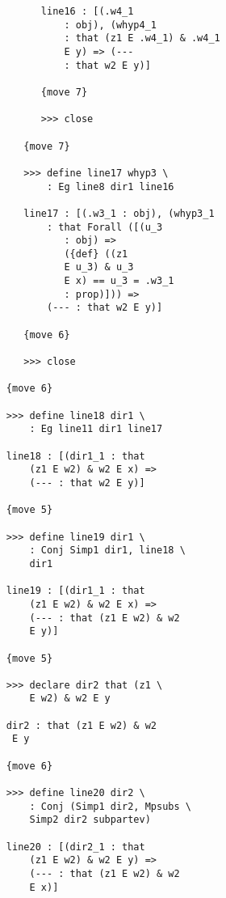 \documentclass[12pt]{article}
\begin{document}
\begin{verbatim}
                        line16 : [(.w4_1 
                            : obj), (whyp4_1 
                            : that (z1 E .w4_1) & .w4_1 
                            E y) => (--- 
                            : that w2 E y)]

                        {move 7}

                        >>> close

                     {move 7}

                     >>> define line17 whyp3 \
                         : Eg line8 dir1 line16

                     line17 : [(.w3_1 : obj), (whyp3_1 
                         : that Forall ([(u_3 
                            : obj) => 
                            ({def} ((z1 
                            E u_3) & u_3 
                            E x) == u_3 = .w3_1 
                            : prop)])) => 
                         (--- : that w2 E y)]

                     {move 6}

                     >>> close

                  {move 6}

                  >>> define line18 dir1 \
                      : Eg line11 dir1 line17

                  line18 : [(dir1_1 : that 
                      (z1 E w2) & w2 E x) => 
                      (--- : that w2 E y)]

                  {move 5}

                  >>> define line19 dir1 \
                      : Conj Simp1 dir1, line18 \
                      dir1

                  line19 : [(dir1_1 : that 
                      (z1 E w2) & w2 E x) => 
                      (--- : that (z1 E w2) & w2 
                      E y)]

                  {move 5}

                  >>> declare dir2 that (z1 \
                      E w2) & w2 E y

                  dir2 : that (z1 E w2) & w2 
                   E y

                  {move 6}

                  >>> define line20 dir2 \
                      : Conj (Simp1 dir2, Mpsubs \
                      Simp2 dir2 subpartev)

                  line20 : [(dir2_1 : that 
                      (z1 E w2) & w2 E y) => 
                      (--- : that (z1 E w2) & w2 
                      E x)]


\end{verbatim}
\end{document}
